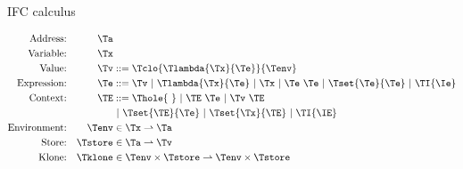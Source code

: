 {\begin{figure}[h]

\caption{IFC calculus}
\end{figure}

\begin{figure}[h]
\begin{align*}
\textrm{Address:}     && \Ta          & \\
\textrm{Variable:}    && \Tx          & \\
\textrm{Value:}       && \Tv          & ::= \Tclo{\Tlambda{\Tx}{\Te}}{\Tenv}\\
\textrm{Expression:}  && \Te          & ::=  \Tv
                                        \ |\ \Tlambda{\Tx}{\Te}
                                        \ |\ \Tx
                                        \ |\ \Te\ \Te
                                        \ |\ \Tset{\Te}{\Te}
                                        \ |\ \TI{\Ie}\\
\textrm{Context:}     && \TE          & ::=  \Thole{\ }
                                        \ |\ \TE\ \Te
                                        \ |\ \Tv\ \TE\\&&&
                                        \ |\ \Tset{\TE}{\Te}
                                        \ |\ \Tset{\Tx}{\TE}
                                        \ |\ \TI{\IE}\\
\textrm{Environment:} && \Tenv        & \in \Tx \rightharpoonup \Ta \\
\textrm{Store:}       && \Tstore      & \in \Ta \rightharpoonup \Tv \\
\textrm{Klone:}       && \Tklone   & \in \Tenv \times \Tstore \rightharpoonup \Tenv \times \Tstore \\
\end{align*}
\begin{mathpar}


\end{mathpar}
\end{figure}}
